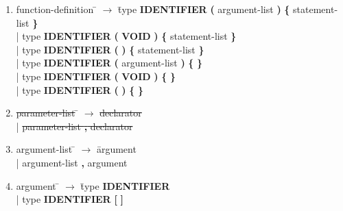 \documentclass[12pt]{article}
\begin{document}
\begin{enumerate}
\item \begin{tabbing} function-definition \= $\rightarrow$ \= type \textbf{IDENTIFIER} \textbf{(} argument-list \textbf{)} \textbf{\{} statement-list \textbf{\}}   \\
	\> \hspace*{0.05cm} 	|\>  type \textbf{IDENTIFIER} \textbf{(} \textbf{VOID} \textbf{)}          \textbf{\{} statement-list \textbf{\}}   \\
	\> \hspace*{0.05cm} 	|\>  type \textbf{IDENTIFIER} \textbf{(} \textbf{)}               \textbf{\{} statement-list \textbf{\}}   \\
	\> \hspace*{0.05cm} 	|\>  type \textbf{IDENTIFIER} \textbf{(} argument-list \textbf{)} \textbf{\{}                \textbf{\}}   \\
	\> \hspace*{0.05cm} 	|\>  type \textbf{IDENTIFIER} \textbf{(} \textbf{VOID} \textbf{)}          \textbf{\{}                \textbf{\}}   \\
	\> \hspace*{0.05cm} 	|\>  type \textbf{IDENTIFIER} \textbf{(} \textbf{)}               \textbf{\{}                \textbf{\}}   \\
\end{tabbing}

\item \begin{tabbing} \sout{parameter-list} \= $\rightarrow$ \= \sout{declarator} \\
	\> \hspace*{0.05cm} | \> \sout{parameter-list \textbf{,} declarator} \\
\end{tabbing}

\item \begin{tabbing} argument-list \= $\rightarrow$ \= argument \\
	\> \hspace*{0.05cm} | \> argument-list \textbf{,} argument
\end{tabbing}

\item \begin{tabbing} argument \= $\rightarrow$ \= type \textbf{IDENTIFIER} \\
	\> \hspace*{0.05cm} | \> type \textbf{IDENTIFIER} \textbf{[} \textbf{]} \\
\end{tabbing}


\end{enumerate}
\end{document}
